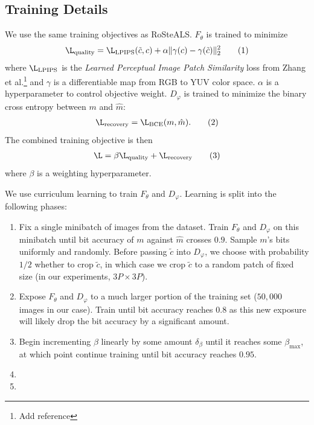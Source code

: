 \documentclass[twocolumn]{article}
\begin{document}
\subsection{Training Details}
We use the same training objectives as RoSteALS. $F_\theta$ is trained to minimize
\begin{align*}
	\L_{\mathrm{quality}} = \L_{\mathrm{LPIPS}}(\tilde c, c) + \alpha \Vert\gamma(c) - \gamma(\tilde c)\Vert_2^2\tag{1}
\end{align*}
where $\L_{\mathrm{LPIPS}}$ is the \textit{Learned Perceptual Image Patch Similarity} loss from Zhang et al.\footnote{\TODO Add reference} and $\gamma$ is a differentiable map from RGB to YUV color space. $\alpha$ is a hyperparameter to control objective weight. $D_\varphi$ is trained to minimize the binary cross entropy between $m$ and $\hat m$:
\begin{align*}
	\L_{\mathrm{recovery}} = \L_{\mathrm{BCE}}(m, \hat m).\tag{2}
\end{align*}
The combined training objective is then
\begin{align*}
	\L = \beta \L_{\mathrm{quality}} + \L_{\mathrm{recovery}}\tag{3}
\end{align*}
where $\beta$ is a weighting hyperparameter.




We use curriculum learning to train $F_\theta$ and $D_\varphi$. Learning is split into the following phases:
\begin{enumerate}
	\item Fix a single minibatch of images from the dataset. Train $F_\theta$ and $D_\varphi$ on this minibatch until bit accuracy of $m$ against $\hat m$ crosses $0.9$. Sample $m$'s bits uniformly and randomly. Before passing $\tilde c$ into $D_\varphi$, we choose with probability $1/2$ whether to crop $\tilde c$, in which case we crop $\tilde c$ to a random patch of fixed size (in our experiments, $3P\times 3P$).
	\item Expose $F_\theta$ and $D_\varphi$ to a much larger portion of the training set ($50{,}000$ images in our case). Train until bit accuracy reaches $0.8$ as this new exposure will likely drop the bit accuracy by a significant amount.
	\item Begin incrementing $\beta$ linearly by some amount $\delta_\beta$ until it reaches some $\beta_{\mathrm{max}}$, at which point continue training until bit accuracy reaches $0.95$.
	\item \TODO
	\item \TODO
\end{enumerate}
\end{document}
